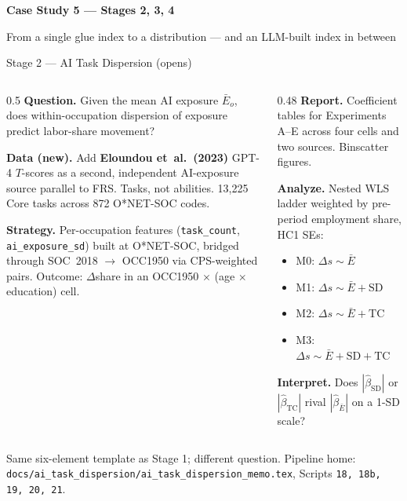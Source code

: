 \documentclass[10pt,english,aspectratio=169]{beamer}
\newcommand{\sectiondivider}[2]{%
\begin{frame}[plain,noframenumbering]
\begin{center}
\vfill
{\Large\textbf{#1}\par}
\vspace{0.35cm}
{\normalsize #2\par}
\vfill
\end{center}
\end{frame}
}
\begin{document}
\sectiondivider{Case Study 5 --- Stages 2, 3, 4}{From a single glue index to a distribution --- and an LLM-built index in between}

\begin{frame}{Stage 2 --- AI Task Dispersion (opens)}
\begin{columns}[T]
\begin{column}{0.5\textwidth}
\textbf{Question.} Given the mean AI exposure $\bar E_o$, does within-occupation dispersion of exposure predict labor-share movement?

\vspace{0.1cm}
\textbf{Data (new).} Add \textbf{Eloundou et~al.~(2023)} GPT-4 $T$-scores as a second, independent AI-exposure source parallel to FRS. Tasks, not abilities. 13{,}225 Core tasks across 872 O*NET-SOC codes.

\vspace{0.1cm}
\textbf{Strategy.} Per-occupation features (\texttt{task\_count}, \texttt{ai\_exposure\_sd}) built at O*NET-SOC, bridged through SOC~2018 $\to$ OCC1950 via CPS-weighted pairs. Outcome: $\Delta$share in an OCC1950 $\times$ (age $\times$ education) cell.
\end{column}
\begin{column}{0.48\textwidth}
\textbf{Report.} Coefficient tables for Experiments A--E across four cells and two sources. Binscatter figures.

\vspace{0.1cm}
\textbf{Analyze.} Nested WLS ladder weighted by pre-period employment share, HC1 SEs:
\begin{itemize}\scriptsize
  \item M0: $\Delta s \sim \bar E$
  \item M1: $\Delta s \sim \bar E + \text{SD}$
  \item M2: $\Delta s \sim \bar E + \text{TC}$
  \item M3: $\Delta s \sim \bar E + \text{SD} + \text{TC}$
\end{itemize}

\vspace{0.1cm}
\textbf{Interpret.} Does $|\hat\beta_{\text{SD}}|$ or $|\hat\beta_{\text{TC}}|$ rival $|\hat\beta_{\bar E}|$ on a 1-SD scale?
\end{column}
\end{columns}

\vspace{0.15cm}
\begin{tcolorbox}[colback=blue!3,colframe=RedTitle!60]\scriptsize
Same six-element template as Stage 1; different question. Pipeline home: \texttt{docs/ai\_task\_dispersion/ai\_task\_dispersion\_memo.tex}, Scripts \texttt{18, 18b, 19, 20, 21}.
\end{tcolorbox}
\end{frame}
\end{document}
